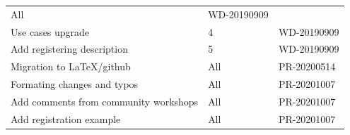 \documentclass[11pt,a4paper]{ivoa}
\begin{document}
\begin{table}[H]
\begin{tabular}{p{3.75in}p{0.92in}p{0.8in}}
\multicolumn{1}{|p{0.72in}}{All} &
\multicolumn{1}{|p{0.9in}|}{{\fontsize{10pt}{12.0pt}\selectfont WD-20190909}} \\
\multicolumn{1}{|p{3.75in}}{Use cases upgrade} &
\multicolumn{1}{|p{0.72in}}{4} &
\multicolumn{1}{|p{0.9in}|}{{\fontsize{10pt}{12.0pt}\selectfont WD-20190909}} \\
\multicolumn{1}{|p{3.75in}}{Add registering description} &
\multicolumn{1}{|p{0.72in}}{5} &
\multicolumn{1}{|p{0.9in}|}{{\fontsize{10pt}{12.0pt}\selectfont WD-20190909}} \\
\multicolumn{1}{|p{3.75in}}{Migration to LaTeX/github} &
\multicolumn{1}{|p{0.72in}}{All} &
\multicolumn{1}{|p{0.9in}|}{{\fontsize{10pt}{12.0pt}\selectfont PR-20200514}} \\
\multicolumn{1}{|p{3.75in}}{Formating changes and typos} &
\multicolumn{1}{|p{0.72in}}{All} &
\multicolumn{1}{|p{0.9in}|}{{\fontsize{10pt}{12.0pt}\selectfont PR-20201007}} \\
\multicolumn{1}{|p{3.75in}}{Add comments from community workshops} &
\multicolumn{1}{|p{0.72in}}{All} &
\multicolumn{1}{|p{0.9in}|}{{\fontsize{10pt}{12.0pt}\selectfont PR-20201007}} \\
\multicolumn{1}{|p{3.75in}}{Add registration example} &
\multicolumn{1}{|p{0.72in}}{All} &
\multicolumn{1}{|p{0.9in}|}{{\fontsize{10pt}{12.0pt}\selectfont PR-20201007}} \\
\hline
\end{tabular}
 \end{table}

\pagebreak



\end{document}
